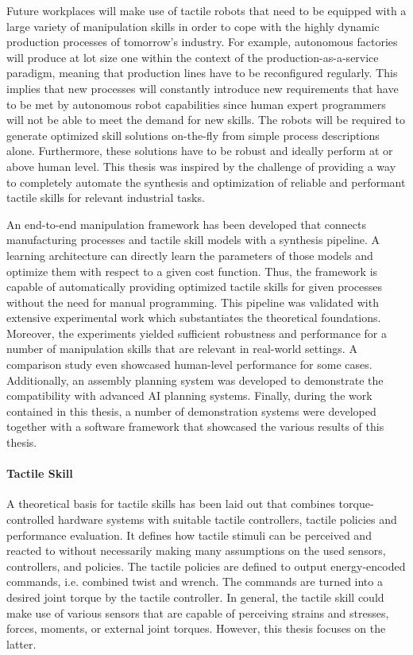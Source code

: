 Future workplaces will make use of tactile robots that need to be equipped with a large variety of manipulation skills in order to cope with the highly dynamic production processes of tomorrow's industry.
For example, autonomous factories will produce at lot size one within the context of the production-as-a-service paradigm, meaning that production lines have to be reconfigured regularly.
This implies that new processes will constantly introduce new requirements that have to be met by autonomous robot capabilities since human expert programmers will not be able to meet the demand for new skills.
The robots will be required to generate optimized skill solutions on-the-fly from simple process descriptions alone.
Furthermore, these solutions have to be robust and ideally perform at or above human level.
This thesis was inspired by the challenge of providing a way to completely automate the synthesis and optimization of reliable and performant tactile skills for relevant industrial tasks.

An end-to-end manipulation framework has been developed that connects manufacturing processes and tactile skill models with a synthesis pipeline.
A learning architecture can directly learn the parameters of those models and optimize them with respect to a given cost function.
Thus, the framework is capable of automatically providing optimized tactile skills for given processes without the need for manual programming.
This pipeline was validated with extensive experimental work which substantiates the theoretical foundations.
Moreover, the experiments yielded sufficient robustness and performance for a number of manipulation skills that are relevant in real-world settings.
A comparison study even showcased human-level performance for some cases.
Additionally, an assembly planning system was developed to demonstrate the compatibility with advanced AI planning systems.
Finally, during the work contained in this thesis, a number of demonstration systems were developed together with a software framework that showcased the various results of this thesis.

\paragraph{Tactile Skill}
A theoretical basis for tactile skills has been laid out that combines torque-controlled hardware systems with suitable tactile controllers, tactile policies and performance evaluation.
It defines how tactile stimuli can be perceived and reacted to without necessarily making many assumptions on the used sensors, controllers, and policies.
The tactile policies are defined to output energy-encoded commands, i.e. combined twist and wrench.
The commands are turned into a desired joint torque by the tactile controller.
In general, the tactile skill could make use of various sensors that are capable of perceiving strains and stresses, forces, moments, or external joint torques. However, this thesis focuses on the latter.

